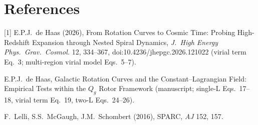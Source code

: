 \documentclass[10pt]{article}
\begin{document}
\section*{References}\small
[1] E.P.J.\ de Haas (2026), From Rotation Curves to Cosmic Time: Probing High-Redshift Expansion through Nested Spiral Dynamics, \emph{J.\ High Energy Phys.\ Grav.\ Cosmol.} 12, 334--367, doi:10.4236/jhepgc.2026.121022 (virial term Eq.~3; multi-region virial model Eqs.~5--7).\par
[2] E.P.J.\ de Haas, Galactic Rotation Curves and the Constant--Lagrangian Field: Empirical Tests within the $Q_g$ Rotor Framework (manuscript; single-L Eqs.~17--18, virial term Eq.~19, two-L Eqs.~24--26).\par
[3] F.\ Lelli, S.S.\ McGaugh, J.M.\ Schombert (2016), SPARC, \emph{AJ} 152, 157.
\end{document}
